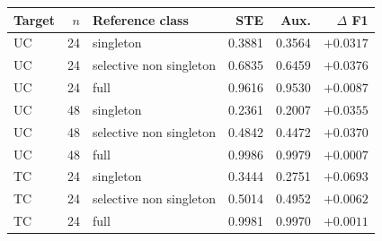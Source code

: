\begin{tabular}{@{}lr lrrr@{}}
\toprule
Target & $n$ & Reference class & STE & Aux. & $\Delta$ F1\\
\midrule
UC & 24 & singleton & 0.3881 & 0.3564 & $+0.0317$\\
UC & 24 & selective non singleton & 0.6835 & 0.6459 & $+0.0376$\\
UC & 24 & full & 0.9616 & 0.9530 & $+0.0087$\\
UC & 48 & singleton & 0.2361 & 0.2007 & $+0.0355$\\
UC & 48 & selective non singleton & 0.4842 & 0.4472 & $+0.0370$\\
UC & 48 & full & 0.9986 & 0.9979 & $+0.0007$\\
TC & 24 & singleton & 0.3444 & 0.2751 & $+0.0693$\\
TC & 24 & selective non singleton & 0.5014 & 0.4952 & $+0.0062$\\
TC & 24 & full & 0.9981 & 0.9970 & $+0.0011$\\
\bottomrule
\end{tabular}
